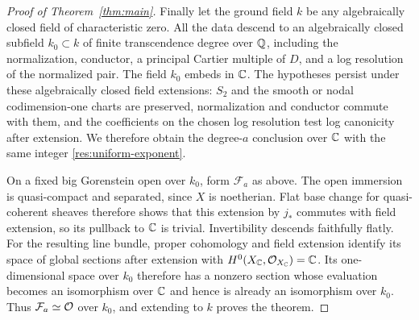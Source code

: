 \begin{proof}[Proof of Theorem~\ref{thm:main}]
 Finally let the ground field $k$ be any algebraically closed field
 of characteristic zero.  All the data descend to an algebraically
 closed subfield $k_0\subset k$ of finite transcendence degree over
 $\mathbb Q$, including the normalization, conductor, a principal Cartier
 multiple of $D$, and a log resolution of the normalized pair.
 The field $k_0$ embeds in $\mathbb C$.  The hypotheses persist under these
 algebraically closed field extensions: $S_2$ and the smooth or
 nodal codimension-one charts are preserved, normalization and
 conductor commute with them, and the coefficients on the chosen
 log resolution test log canonicity after extension.  We therefore
 obtain the degree-$a$ conclusion over $\mathbb C$ with the same integer
 \eqref{res:uniform-exponent}.

 On a fixed big Gorenstein open over $k_0$, form $\mathcal F_a$ as
 above.  The open immersion is quasi-compact and separated, since
 $X$ is noetherian.  Flat base change for quasi-coherent sheaves
 therefore shows that this extension by $j_*$ commutes with field
 extension, so its pullback to $\mathbb C$ is trivial.  Invertibility
 descends faithfully flatly.  For the resulting line bundle,
 proper cohomology and field extension identify its space of
 global sections after extension with $H^0(X_{\mathbb C},\mathcal O_{X_{\mathbb C}})
 =\mathbb C$.  Its one-dimensional space over $k_0$ therefore has a
 nonzero section whose evaluation becomes an isomorphism over
 $\mathbb C$ and hence is already an isomorphism over $k_0$.  Thus
 $\mathcal F_a\simeq\mathcal O$ over $k_0$, and extending to $k$ proves
 the theorem.
\end{proof}
